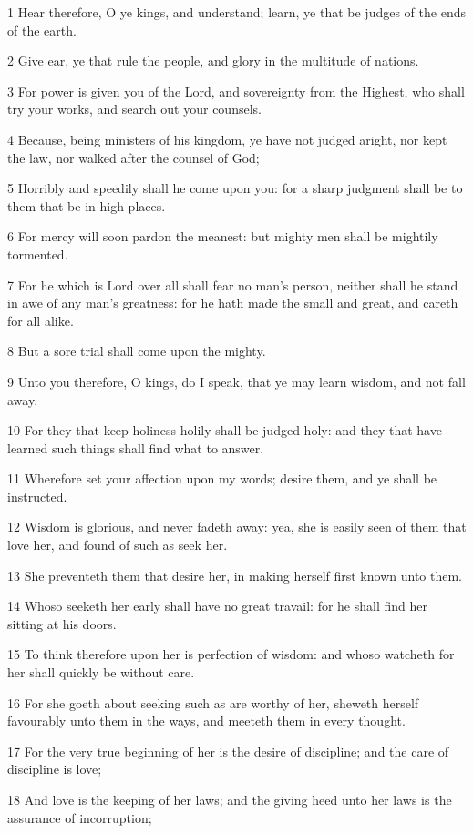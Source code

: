 \par 1 Hear therefore, O ye kings, and understand; learn, ye that be judges of the ends of the earth.
\par 2 Give ear, ye that rule the people, and glory in the multitude of nations.
\par 3 For power is given you of the Lord, and sovereignty from the Highest, who shall try your works, and search out your counsels.
\par 4 Because, being ministers of his kingdom, ye have not judged aright, nor kept the law, nor walked after the counsel of God;
\par 5 Horribly and speedily shall he come upon you: for a sharp judgment shall be to them that be in high places.
\par 6 For mercy will soon pardon the meanest: but mighty men shall be mightily tormented.
\par 7 For he which is Lord over all shall fear no man's person, neither shall he stand in awe of any man's greatness: for he hath made the small and great, and careth for all alike.
\par 8 But a sore trial shall come upon the mighty.
\par 9 Unto you therefore, O kings, do I speak, that ye may learn wisdom, and not fall away.
\par 10 For they that keep holiness holily shall be judged holy: and they that have learned such things shall find what to answer.
\par 11 Wherefore set your affection upon my words; desire them, and ye shall be instructed.
\par 12 Wisdom is glorious, and never fadeth away: yea, she is easily seen of them that love her, and found of such as seek her.
\par 13 She preventeth them that desire her, in making herself first known unto them.
\par 14 Whoso seeketh her early shall have no great travail: for he shall find her sitting at his doors.
\par 15 To think therefore upon her is perfection of wisdom: and whoso watcheth for her shall quickly be without care.
\par 16 For she goeth about seeking such as are worthy of her, sheweth herself favourably unto them in the ways, and meeteth them in every thought.
\par 17 For the very true beginning of her is the desire of discipline; and the care of discipline is love;
\par 18 And love is the keeping of her laws; and the giving heed unto her laws is the assurance of incorruption;
